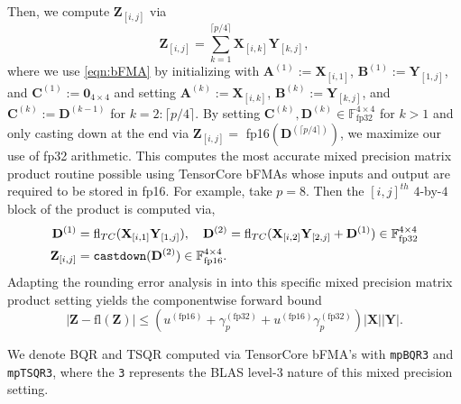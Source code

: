 \documentclass[review,onefignum,onetabnum]{siamart190516}
\newcommand{\F}{\mathbb{F}}
\newcommand{\bb}[1]{\mathbf{#1}}
\newcommand{\fl}{\mathrm{fl}}
\begin{document}
Then, we compute $\bb{Z}_{[i,j]}$ via \[
\bb{Z}_{[i,j]} = \sum_{k=1}^{\lceil p/4\rceil} \bb{X}_{[i,k]} \bb{Y}_{[k,j]},
\]
where we use \cref{eqn:bFMA} by initializing with $\bb{A}^{(1)}:= \bb{X}_{[i,1]}$, $\bb{B}^{(1)}:= \bb{Y}_{[1,j]}$, and $\bb{C}^{(1)}:= \bb{0}_{4\times 4}$ and setting $\bb{A}^{(k)}:= \bb{X}_{[i,k]}$, $\bb{B}^{(k)}:= \bb{Y}_{[k,j]}$, and $\bb{C}^{(k)}:= \bb{D}^{(k-1)}$ for $k=2:\lceil p/4\rceil$.
By setting $\bb{C}^{(k)}, \bb{D}^{(k)}\in\F_{\text{fp32}}^{4\times 4}$ for $k>1$ and only casting down at the end via $\bb{Z}_{[i,j]} =$ fp16$(\bb{D}^{(\lceil p/4\rceil)})$, we maximize our use of fp32 arithmetic.
This computes the most accurate mixed precision matrix product routine possible using TensorCore bFMAs whose inputs and output are required to be stored in fp16.
For example, take $p=8$.
Then the $[i,j]^{th}$ $4$-by-$4$ block of the product is computed via,
\begin{align*}
\bb{D}^{(1)} &= \fl_{TC}(\bb{X}_{[i,1]} \bb{Y}_{[1,j]}),\quad\bb{D}^{(2)} = \fl_{TC}(\bb{X}_{[i,2]} \bb{Y}_{[2,j]} + \bb{D}^{(1)})\in\F_{\text{fp32}}^{4\times 4}\\
\bb{Z}_{[i,j]} &= \text{\tt castdown}(\bb{D}^{(2)})\in\F_{\text{fp16}}^{4\times 4}.
\end{align*}
Adapting the rounding error analysis in \cite{Blanchard2020} into this specific mixed precision matrix product setting yields the componentwise forward bound 
\begin{equation}
|\bb{Z}-\fl(\bb{Z})| \leq \left(u^{(\text{fp16})}+ \gamma_{p}^{(\text{fp32})}+u^{(\text{fp16})} \gamma_{p}^{(\text{fp32})}\right)|\bb{X}||\bb{Y}|.\label{eqn:bFMAerr}
\end{equation}

We denote BQR and TSQR computed via TensorCore bFMA's with {\tt mpBQR3} and {\tt mpTSQR3}, where the {\tt 3} represents the BLAS level-3 nature of this mixed precision setting.
\end{document}
